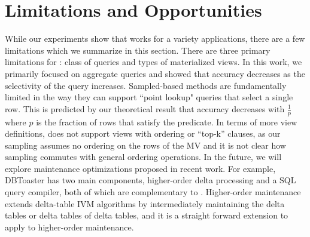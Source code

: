 \vspace{-1em}
\section{Limitations and Opportunities}\vspace{-.3em}\label{sec:disc}
While our experiments show that \svc works for a variety applications, there are a few limitations which we summarize in this section.
There are three primary limitations for \svc: class of queries and types of materialized views.
In this work, we primarily focused on aggregate queries and showed that accuracy decreases as the selectivity of the query increases.
Sampled-based methods are fundamentally limited in the way they can support ``point lookup" queries that select a single row.
This is predicted by our theoretical result that accuracy decreases with $\frac{1}{p}$ where $p$ is the fraction of rows that satisfy the predicate.
In terms of more view definitions, \svc does not support views with ordering or ``top-k'' clauses, as our sampling assumes no ordering on the rows of the MV and it is not clear how sampling commutes with general ordering operations.
In the future, we will explore maintenance optimizations proposed in recent work.
For example, DBToaster has two main components, higher-order delta processing and a SQL query compiler, both of which are complementary to \svc.
Higher-order maintenance extends delta-table IVM algorithms by intermediately maintaining the delta tables or delta tables of delta tables, and it is a straight forward extension to apply \svc to higher-order maintenance.

